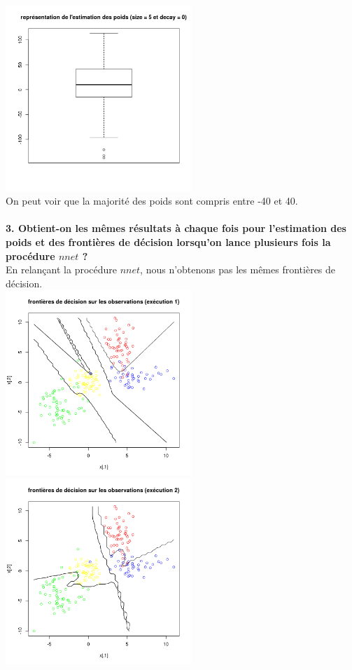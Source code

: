 \documentclass[a4paper, 10pt]{article}
\begin{document}
\includegraphics[height = 7cm, width = 7cm]{plots/poids_q2_2_2.png}\\
On peut voir que la majorité des poids sont compris entre -40 et 40.\\ \\
\textbf{3. Obtient-on les mêmes résultats à chaque fois pour l'estimation des poids et des frontières de décision lorsqu'on lance plusieurs fois la procédure $nnet$ ?}\\
En relançant la procédure $nnet$, nous n'obtenons pas les mêmes frontières de décision.\\
\includegraphics[height = 7cm, width = 7cm]{plots/frontiere_bayes_q2_1.png}
\includegraphics[height = 7cm, width = 7cm]{plots/frontiere_bayes_q2_2.png}\\
\end{document}
